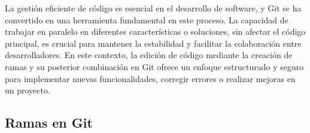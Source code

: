 La gestión eficiente de código es esencial en el desarrollo de software, y Git se ha
convertido en una herramienta fundamental en este proceso. La capacidad de trabajar
en paralelo en diferentes características o soluciones, sin afectar el código principal, 
es crucial para mantener la estabilidad y facilitar la colaboración entre desarrolladores. 
En este contexto, la edición de código mediante la creación de ramas y su posterior 
combinación en Git ofrece un enfoque estructurado y seguro para implementar nuevas 
funcionalidades, corregir errores o realizar mejoras en un proyecto.

\subsection*{Ramas en Git}
